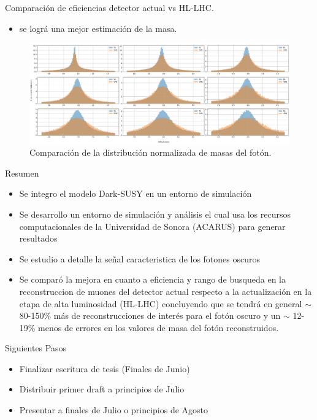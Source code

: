 \begin{frame}{Comparaci\'on de eficiencias detector actual vs HL-LHC.}

\begin{itemize}
\item se logr\'a una mejor estimaci\'on de la masa.
\end{itemize}
\begin{figure}[h]
\centering
\includegraphics[width=1\textwidth]{Imag/Datos_Photon4muon_ALL.png}
\caption{Comparaci\'on de la distribuci\'on normalizada de masas del fot\'on.}
\end{figure}
\end{frame}



\begin{frame}{Resumen}
\begin{itemize}
\item Se integro el modelo Dark-SUSY en un entorno de simulaci\'on
\item Se desarrollo un entorno de simulaci\'on y an\'alisis el cual usa los recursos computacionales de la Universidad de Sonora (ACARUS) para generar resultados 
\item Se estudio a detalle la se\~nal caracteristica de los fotones oscuros
\item Se compar\'o la mejora en cuanto a eficiencia y rango de busqueda en la reconstruccion de muones del detector actual respecto a la actualizaci\'on en la etapa de alta luminosidad (HL-LHC) concluyendo que se tendr\'a en general $\sim$ 80-150\% m\'as de reconstrucciones de inter\'es para el fot\'on oscuro y un $\sim$ 12-19\% menos de errores en los valores de masa del fot\'on reconstruidos. %
\end{itemize}
  
\end{frame}



\begin{frame}{Siguientes Pasos}
\begin{itemize}
\item Finalizar escritura de tesis (Finales de Junio) 
\item Distribuir primer draft a  principios de Julio
\item Presentar a finales de Julio o principios de Agosto
\end{itemize}
    
\end{frame}